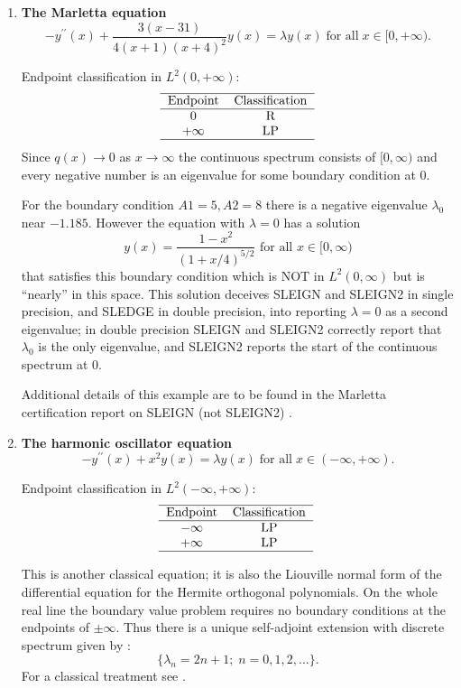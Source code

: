 \documentclass[12pt]{amsart}%
\theoremstyle{plain}
\numberwithin{equation}{section}
\begin{document}
\begin{enumerate}
\item \textbf{The Marletta equation}%
\[
-y^{\prime\prime}(x)+\frac{3(x-31)}{4(x+1)(x+4)^{2}}y(x)=\lambda
y(x)\;\text{for all}\;x\in\lbrack0,+\infty).
\]

Endpoint classification in $L^{2}(0,+\infty)$:%
\[%
\begin{tabular}
[c]{cc}\hline
Endpoint & Classification\\\hline
$0$ & R\\
$+\infty$ & LP\\\hline
\end{tabular}
\]
Since $q(x)\rightarrow0$ as $x\rightarrow\infty$ the continuous spectrum
consists of $[0,\infty)$ and every negative number is an eigenvalue for some
boundary condition at $0.$

For the boundary condition $A1=5,A2=8$ there is a negative eigenvalue
$\lambda_{0}$ near $-1.185.$ However the equation with $\lambda=0$ has a
solution
\[
y(x)=\frac{1-x^{2}}{(1+x/4)^{5/2}}\text{ for all }x\in\lbrack0,\infty)
\]
that satisfies this boundary condition which is NOT in $L^{2}(0,\infty)$ but
is ``nearly'' in this space. This solution deceives SLEIGN and SLEIGN2 in
single precision, and SLEDGE in double precision, into reporting $\lambda=0$
as a second eigenvalue; in double precision SLEIGN and SLEIGN2 correctly
report that $\lambda_{0}$ is the only eigenvalue, and SLEIGN2 reports the
start of the continuous spectrum at $0.$

Additional details of this example are to be found in the Marletta
certification report on SLEIGN (not SLEIGN2) \cite{M}.

\item \textbf{The harmonic oscillator equation}%
\[
-y^{\prime\prime}(x)+x^{2}y(x)=\lambda y(x)\;\text{for all}\;x\in
(-\infty,+\infty).
\]

Endpoint classification in $L^{2}(-\infty,+\infty)$:%
\[%
\begin{tabular}
[c]{cc}\hline
Endpoint & Classification\\\hline
$-\infty$ & LP\\
$+\infty$ & LP\\\hline
\end{tabular}
\
\]

This is another classical equation; it is also the Liouville normal form of
the differential equation for the Hermite orthogonal polynomials. On the whole
real line the boundary value problem requires no boundary conditions at the
endpoints of $\pm\infty$. Thus there is a unique self-adjoint extension with
discrete spectrum given by :
\[
\{\lambda_{n}=2n+1;\;n=0,1,2,...\}.
\]
For a classical treatment see \cite[Chapter IV, Section 2]{T}.


\end{enumerate}
\end{document}
